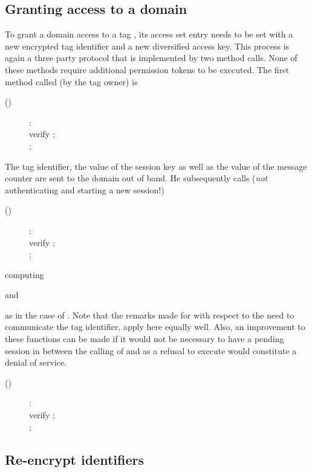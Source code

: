 \subsection{Granting access to a domain}
\label{ssec-grantingaccess}

To grant a domain  access to a tag , its access set entry
 needs to be set with 
a new encrypted tag identifier and a new diversified access key.
This process is again a three party protocol that is implemented by two method calls. 
None of these methods require additional permission tokens to be executed.
The first method called (by the tag owner) is
\begin{description}
\item[()]:\\
	verify  ; \\
	 ; 
\end{description}
The tag identifier, the value of the session key as well as the value of the message counter 
are sent to the domain  out of band.
He subsequently calls (\emph{not} authenticating and starting a new session!)
\begin{description}
\item[()]:\\
	verify  ; \\
	  ;
\end{description}
computing

and 
 
as in the case of .
Note that the remarks made for  with respect to 
the need to communicate the tag identifier, apply here equally well.
Also, an improvement to these functions can be made if it would not be
necessary to have a pending session in between the calling of  
and  as a refusal to execute  
would constitute a denial of service.
\begin{description}
\item[()]:\\
	verify  ; \\
	 ; 
\end{description}

\subsection{Re-encrypt identifiers}
\label{ssec-reencrypt-method}

